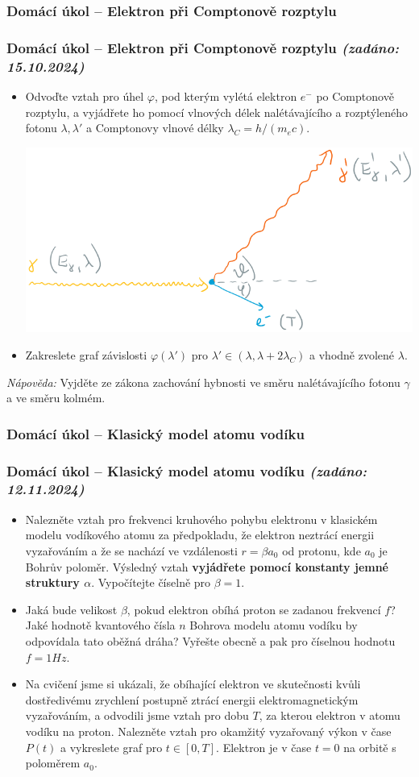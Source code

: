 \documentclass[a4paper,11pt,twoside]{article}
\newenvironment{homework}{}{}
\newcommand{\np}{\clearpage\newpage}
\newcommand{\exercise}[2][]{\ifthenelse{\isempty{#1}}
	{\np\thispagestyle{empty}\subsubsection*{Domácí úkol -- #2}}
	{\np\thispagestyle{empty}\np\subsubsection*{Domácí úkol -- #2 \small{\it{(zadáno: {#1})}}}}
}
\begin{document}
\begin{homework}
\exercise[15.10.2024]{Elektron při Comptonově rozptylu}
	\begin{itemize}
	\item
		Odvoďte vztah pro úhel $\varphi$, pod kterým vylétá elektron $e^{-}$ po Comptonově rozptylu, a vyjádřete ho pomocí vlnových délek nalétávajícího a rozptýleného fotonu $\lambda,\lambda'$ a Comptonovy vlnové délky $\lambda_{C}=h/(m_{e}c)$.
		\begin{center}
			\includegraphics[width=0.8\linewidth]{Compton.png}
		\end{center}
	
	\item 
		Zakreslete graf závislosti $\varphi(\lambda')$ pro $\lambda'\in(\lambda,\lambda+2\lambda_{C})$ a vhodně zvolené $\lambda$.

	\end{itemize}
	\emph{Nápověda:} Vyjděte ze zákona zachování hybnosti ve směru nalétávajícího fotonu $\gamma$ a ve směru kolmém.
\end{homework}

\begin{homework}
	\exercise[12.11.2024]{Klasický model atomu vodíku}
	\begin{itemize}
		\item     
			Nalezněte vztah pro frekvenci kruhového pohybu elektronu v klasickém modelu vodíkového atomu za předpokladu, že elektron neztrácí energii vyzařováním a že se nachází ve vzdálenosti $r=\beta a_{0}$ od protonu, kde $a_{0}$ je Bohrův poloměr.
			Výsledný vztah {\bf vyjádřete pomocí konstanty jemné struktury $\alpha$}.
			Vypočítejte číselně pro $\beta=1$.

		\item
			Jaká bude velikost $\beta$, pokud elektron obíhá proton se zadanou frekvencí $f$?
			Jaké hodnotě kvantového čísla $n$ Bohrova modelu atomu vodíku by odpovídala tato oběžná dráha?
			Vyřešte obecně a pak pro číselnou hodnotu $f=1\unit{Hz}$.

		\item
			Na cvičení jsme si ukázali, že obíhající elektron ve skutečnosti kvůli dostředivému zrychlení postupně ztrácí energii elektromagnetickým vyzařováním, a odvodili jsme vztah pro dobu $T$, za kterou elektron v atomu vodíku  na proton.
			Nalezněte vztah pro okamžitý vyzařovaný výkon v čase $P(t)$ a vykreslete graf pro $t\in[0,T]$.
			Elektron je v čase $t=0$ na orbitě s poloměrem $a_{0}$.
	\end{itemize}
\end{homework}
\end{document}
